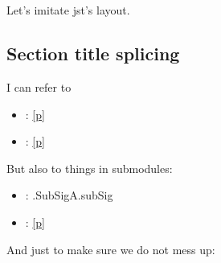 {\begin{ocamlindent}
\label{container-page-test-module-Ocamlary-module-Aliases-type-p1}\\
\label{container-page-test-module-Ocamlary-module-Aliases-type-p2}\\
\end{ocamlindent}%
\begin{ocamlindent}Let's imitate jst's layout.\end{ocamlindent}%
\medbreak
\subsection{Section title splicing\label{section-title-splicing}}%
I can refer to

\begin{itemize}\item{ : \hyperref[container-page-test-module-Ocamlary-indexmodules]{[p\pageref*{container-page-test-module-Ocamlary-indexmodules}]}}%
\item{ : \hyperref[container-page-test-module-Ocamlary-aliases]{[p\pageref*{container-page-test-module-Ocamlary-aliases}]}}\end{itemize}%
But also to things in submodules:

\begin{itemize}\item{ : .SubSigA.subSig}%
\item{ : \hyperref[container-page-test-module-Ocamlary-incl]{[p\pageref*{container-page-test-module-Ocamlary-incl}]}}\end{itemize}%
And just to make sure we do not mess up:

}
